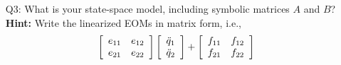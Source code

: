 \documentclass[12pt]{report}
\newcommand\drew[1]{\textcolor{red}{#1}}
\newcommand{\pder}[2]{\frac{\partial #1}{\partial #2}}
\begin{document}
\begin{enumerate}
    \item[Q3:] What is your state-space model, including symbolic matrices $A$ and $B$?\\
          \textbf{Hint:} Write the linearized EOMs in matrix form, i.e.,
          \[
              \left[\begin{array}{c c}
                      e_{11} & e_{12} \\
                      e_{21} & e_{22}
                  \end{array}\right]
              \left[\begin{array}{c}
                      \ddot{q}_{1} \\
                      \ddot{q}_{2}
                  \end{array}\right] +
              \left[\begin{array}{c c}
                      f_{11} & f_{12} \\
                      f_{21} & f_{22}
                  \end{array}\right]
\]
\end{enumerate}
\end{document}
